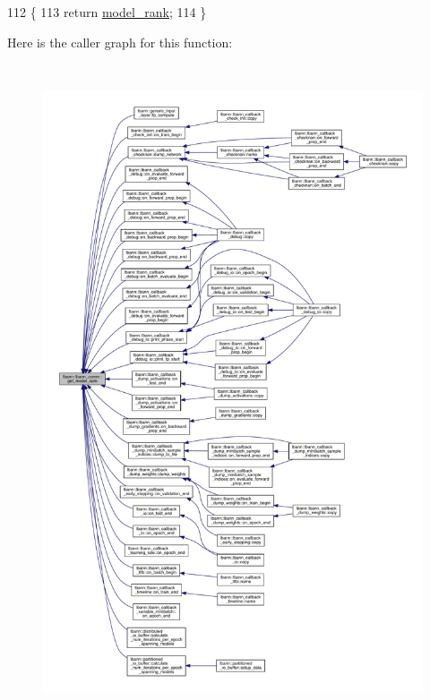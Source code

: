 \begin{DoxyCode}
112                                     \{
113     \textcolor{keywordflow}{return} \hyperlink{classlbann_1_1lbann__comm_a1f3f90a996dbba4cd1cca60596933ea3}{model\_rank};
114   \}
\end{DoxyCode}
Here is the caller graph for this function\+:\nopagebreak
\begin{figure}[H]
\begin{center}
\leavevmode
\includegraphics[height=550pt]{classlbann_1_1lbann__comm_a6422f70c92bed0b78179facc52b066f7_icgraph}
\end{center}
\end{figure}
\mbox{\label{classlbann_1_1lbann__comm_ad5a4f05dc5a2c992ebb659650a7dc6ce}} 
